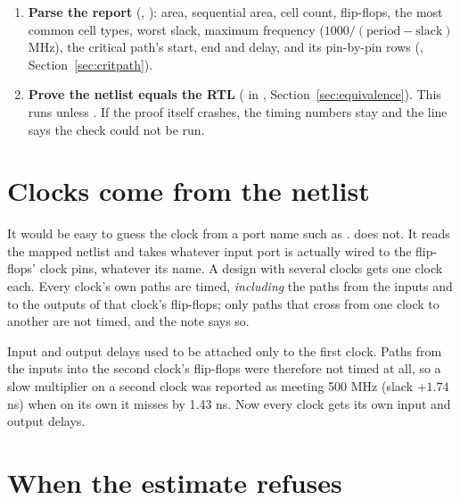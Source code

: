 \begin{enumerate}
  \item \textbf{Parse the report} (, ): area, sequential area, cell count, flip-flops, the most common cell types, worst slack, maximum frequency ($1000 / (\text{period} - \text{slack})$ MHz), the critical path's start, end and delay, and its pin-by-pin rows (, Section~\ref{sec:critpath}).
  \item \textbf{Prove the netlist equals the RTL} ( in , Section~\ref{sec:equivalence}). This runs unless . If the proof itself crashes, the timing numbers stay and the line says the check could not be run.
\end{enumerate}

\section{Clocks come from the netlist}

It would be easy to guess the clock from a port name such as .  does not. It reads the mapped netlist and takes whatever input port is actually wired to the flip-flops' clock pins, whatever its name. A design with several clocks gets one clock each. Every clock's own paths are timed, \emph{including} the paths from the inputs and to the outputs of that clock's flip-flops; only paths that cross from one clock to another are not timed, and the note says so.

\begin{warnbox}
Input and output delays used to be attached only to the first clock. Paths from the inputs into the second clock's flip-flops were therefore not timed at all, so a slow multiplier on a second clock was reported as meeting 500 MHz (slack $+1.74$ ns) when on its own it misses by 1.43 ns. Now every clock gets its own input and output delays.
\end{warnbox}

\section{When the estimate refuses}

